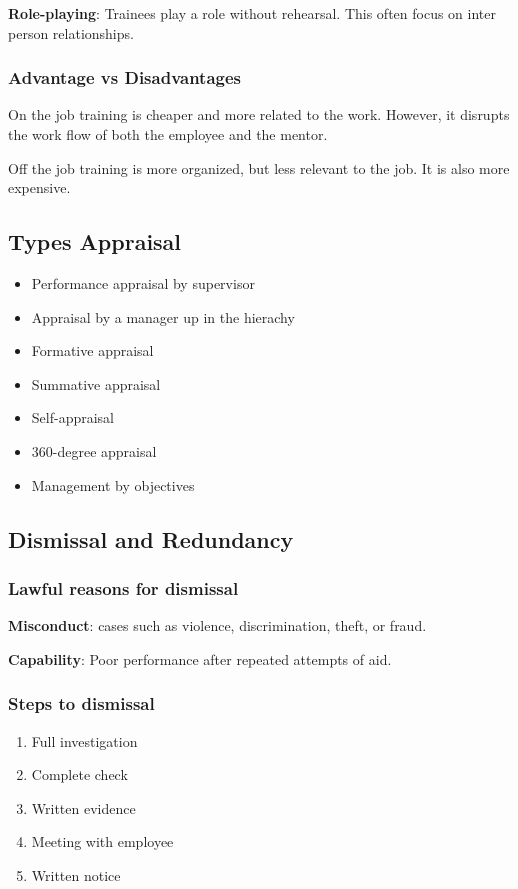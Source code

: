 \documentclass{standalone}
\begin{document}
\textbf{Role-playing}: Trainees play a role without rehearsal. 
This often focus on inter person relationships.

\subsubsection{Advantage vs Disadvantages}
On the job training is cheaper and more related to the work.
However, it disrupts the work flow of both the employee and the mentor.

Off the job training is more organized, but less relevant to the job.
It is also more expensive.

\subsection{Types Appraisal}
\begin{itemize}
	\item Performance appraisal by supervisor
	\item Appraisal by a manager up in the hierachy
	\item Formative appraisal
	\item Summative appraisal
	\item Self-appraisal
	\item 360-degree appraisal
	\item Management by objectives
\end{itemize}

\subsection{Dismissal and Redundancy}

\subsubsection{Lawful reasons for dismissal}
\textbf{Misconduct}: cases such as violence, discrimination, theft, or fraud.

\textbf{Capability}: Poor performance after repeated attempts of aid.

\subsubsection{Steps to dismissal}
\begin{enumerate}
	\item Full investigation
	\item Complete check
	\item Written evidence
	\item Meeting with employee
	\item Written notice
\end{enumerate}
\end{document}
